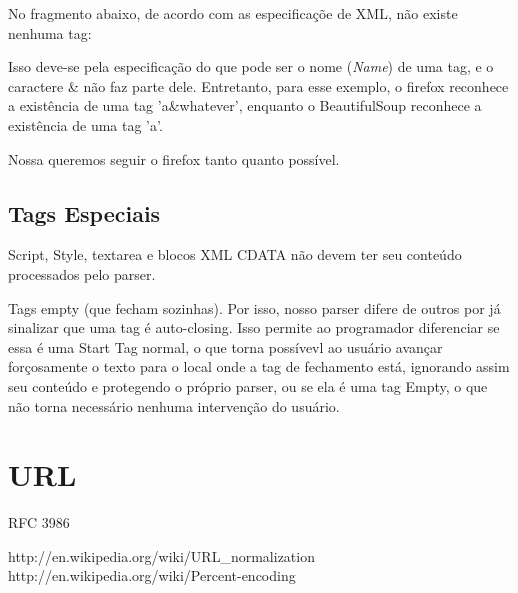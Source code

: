 No fragmento abaixo, de acordo com as especificaçõe de XML, não existe nenhuma tag:

Isso deve-se pela especificação do que pode ser o nome (\emph{Name}) de uma tag, e o caractere \& não faz parte dele. Entretanto, para esse exemplo, o firefox reconhece a existência de uma tag 'a&whatever', enquanto o BeautifulSoup reconhece a existência de uma tag 'a'.

Nossa queremos seguir o firefox tanto quanto possível.

\subsection{Tags Especiais}

Script, Style, textarea e blocos XML CDATA não devem ter seu conteúdo processados pelo parser.

Tags empty (que fecham sozinhas). Por isso, nosso parser difere de outros por
já sinalizar que uma tag é auto-closing. Isso permite ao programador
diferenciar se essa é uma Start Tag normal, o que torna possívevl ao usuário
avançar forçosamente o texto para o local onde a tag de fechamento está,
ignorando assim seu conteúdo e protegendo o próprio parser, ou se ela é uma tag
Empty, o que não torna necessário nenhuma intervenção do usuário.

\section{URL}

RFC 3986

http://en.wikipedia.org/wiki/URL_normalization
http://en.wikipedia.org/wiki/Percent-encoding



